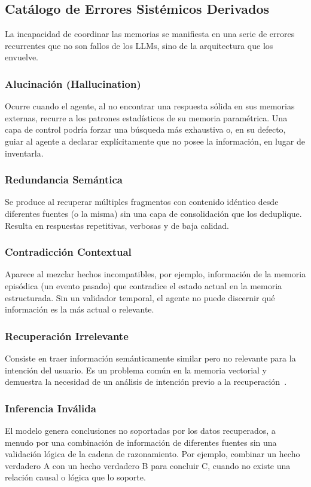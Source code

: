 \documentclass[conference]{IEEEtran}
\begin{document}
\subsection{Catálogo de Errores Sistémicos Derivados}
La incapacidad de coordinar las memorias se manifiesta en una serie de errores recurrentes que no son fallos de los LLMs, sino de la arquitectura que los envuelve.

\subsubsection{Alucinación (Hallucination)}
Ocurre cuando el agente, al no encontrar una respuesta sólida en sus memorias externas, recurre a los patrones estadísticos de su memoria paramétrica. Una capa de control podría forzar una búsqueda más exhaustiva o, en su defecto, guiar al agente a declarar explícitamente que no posee la información, en lugar de inventarla.

\subsubsection{Redundancia Semántica}
Se produce al recuperar múltiples fragmentos con contenido idéntico desde diferentes fuentes (o la misma) sin una capa de consolidación que los deduplique. Resulta en respuestas repetitivas, verbosas y de baja calidad.

\subsubsection{Contradicción Contextual}
Aparece al mezclar hechos incompatibles, por ejemplo, información de la memoria episódica (un evento pasado) que contradice el estado actual en la memoria estructurada. Sin un validador temporal, el agente no puede discernir qué información es la más actual o relevante.

\subsubsection{Recuperación Irrelevante}
Consiste en traer información semánticamente similar pero no relevante para la intención del usuario. Es un problema común en la memoria vectorial y demuestra la necesidad de un análisis de intención previo a la recuperación~\cite{gao2023retrieval}.

\subsubsection{Inferencia Inválida}
El modelo genera conclusiones no soportadas por los datos recuperados, a menudo por una combinación de información de diferentes fuentes sin una validación lógica de la cadena de razonamiento. Por ejemplo, combinar un hecho verdadero A con un hecho verdadero B para concluir C, cuando no existe una relación causal o lógica que lo soporte.
\end{document}
